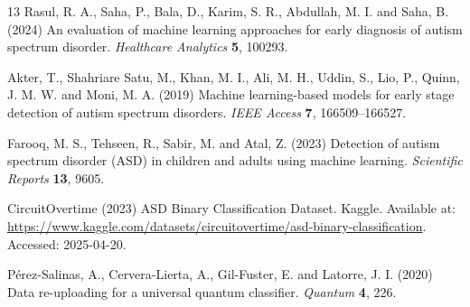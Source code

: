 \documentclass[runningheads]{llncs}
\begin{document}
\begin{thebibliography}{13}
Rasul, R. A., Saha, P., Bala, D., Karim, S. R., Abdullah, M. I. and Saha, B. (2024) An evaluation of machine learning approaches for early diagnosis of autism spectrum disorder. \emph{Healthcare Analytics} \textbf{5}, 100293.

Akter, T., Shahriare Satu, M., Khan, M. I., Ali, M. H., Uddin, S., Lio, P., Quinn, J. M. W. and Moni, M. A. (2019) Machine learning-based models for early stage detection of autism spectrum disorders. \emph{IEEE Access} \textbf{7}, 166509--166527.

Farooq, M. S., Tehseen, R., Sabir, M. and Atal, Z. (2023) Detection of autism spectrum disorder (ASD) in children and adults using machine learning. \emph{Scientific Reports} \textbf{13}, 9605.

CircuitOvertime (2023) ASD Binary Classification Dataset. Kaggle. Available at: \url{https://www.kaggle.com/datasets/circuitovertime/asd-binary-classification}. Accessed: 2025-04-20.

P\'{e}rez-Salinas, A., Cervera-Lierta, A., Gil-Fuster, E. and Latorre, J. I. (2020) Data re-uploading for a universal quantum classifier. \emph{Quantum} \textbf{4}, 226.

\end{thebibliography}
\end{document}

